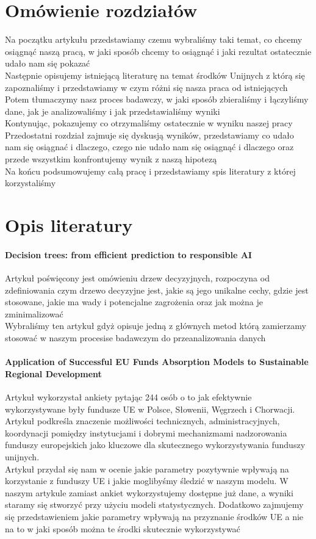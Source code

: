 \documentclass[12pt]{article}
\begin{document}
\section{Omówienie rozdziałów}
Na początku artykułu przedstawiamy czemu wybraliśmy taki temat, co chcemy osiągnąć 
naszą pracą, w jaki sposób chcemy to osiągnąć i jaki rezultat ostatecznie udało nam się 
pokazać \\  
Następnie opisujemy istniejącą literaturę na temat środków Unijnych z którą się 
zapoznaliśmy i przedstawiamy w czym różni się nasza praca od istniejących \\ 
Potem tłumaczymy nasz proces badawczy, w jaki sposób zbieraliśmy i łączyliśmy dane, 
jak je analizowaliśmy i jak przedstawialiśmy wyniki \\ 
Kontynując, pokazujemy co otrzymaliśmy ostatecznie w wyniku naszej pracy \\ 
Przedostatni rozdział zajmuje się dyskusją wyników, przedstawiamy co udało nam się 
osiągnać i dlaczego, czego nie udało nam się osiągnąć i dlaczego oraz przede wszystkim 
konfrontujemy wynik z naszą hipotezą \\ 
Na końcu podsumowujemy całą pracę i przedstawiamy spis literatury z której korzystaliśmy

\section{Opis literatury}
\paragraph{Decision trees: from efficient prediction to responsible AI}
Artykuł poświęcony jest omówieniu drzew decyzyjnych, rozpoczyna od zdefiniowania czym 
drzewo decyzyjne jest, jakie są jego unikalne cechy, gdzie jest stosowane, jakie ma wady 
i potencjalne zagrożenia oraz jak można je zminimalizować \cite{4} \\ 
Wybraliśmy ten artykuł gdyż opisuje jedną z głównych metod którą zamierzamy stosować w 
naszym procesise badawczym do przeanalizowania danych 
\paragraph{Application of Successful EU Funds Absorption Models to Sustainable Regional Development}
Artykuł wykorzystał ankiety pytając 244 osób o to jak 
efektywnie wykorzystywane były fundusze UE w Polsce, Słowenii, 
Węgrzech i Chorwacji. Artykuł podkreśla znaczenie możliwości 
technicznych, administracyjnych, koordynacji pomiędzy 
instytucjami i dobrymi mechanizmami nadzorowania funduszy 
europejskich jako kluczowe dla skutecznego wykorzystywania 
funduszy unijnych.  \cite{5} \\ 
Artykuł przydał się nam w ocenie jakie parametry pozytywnie wpływają na korzystanie z funduszy UE i jakie moglibyśmy śledzić w naszym modelu.
W naszym artykule zamiast ankiet wykorzystujemy dostępne już dane, a wyniki staramy się stworzyć przy użyciu modeli statystycznych. Dodatkowo zajmujemy się przedstawieniem jakie parametry wpływają na przyznanie środków UE a nie na to w jaki sposób można te środki skutecznie wykorzystywać 
\end{document}

